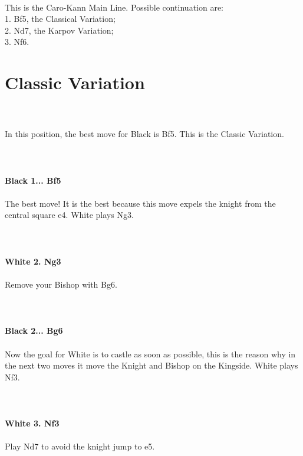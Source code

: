 \documentclass{article}
\begin{document}
\\
This is the Caro-Kann Main Line. Possible continuation are:\\1. Bf5, the Classical Variation;\\2. Nd7, the Karpov Variation;\\3. Nf6. \section{ Classic Variation}

\\
\\
In this position, the best move for Black is Bf5. This is the Classic Variation. \\
\\

\\
\\
\textbf{Black 1... Bf5}\\
\\
The best move! It is the best because this move expels the knight from the central square e4. White plays Ng3. \\
\\

\\
\\
\textbf{White 2. Ng3}\\
\\
Remove your Bishop with Bg6. \\
\\

\\
\\
\textbf{Black 2... Bg6}\\
\\
Now the goal for White is to castle as soon as possible, this is the reason why in the next two moves it move the Knight and Bishop on the Kingside. White plays Nf3.\\
\\

\\
\\
\textbf{White 3. Nf3}\\
\\
Play Nd7 to avoid the knight jump to e5. \\
\\

\end{document}
